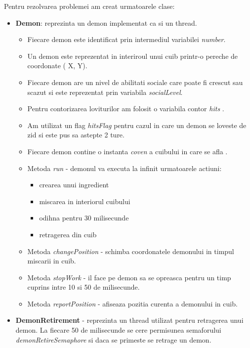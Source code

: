 \documentclass{article}
\begin{document}
    Pentru rezolvarea problemei am creat urmatoarele clase:
        \begin{itemize}
        \item \textbf{Demon}: reprezinta un demon implementat ca si un thread.
        \vspace{0.5cm}
         \begin{itemize}
        \item Fiecare demon este identificat prin intermediul variabilei \textit{number}. 
        \item Un demon este reprezentat in interiroul unui cuib printr-o pereche de coordonate ( X, Y). 
        \item Fiecare demon are un nivel de abilitati sociale care poate fi crescut sau scazut si este reprezentat prin variabila  \textit{socialLevel}.
        \item Pentru contorizarea loviturilor am folosit o variabila contor \textit{hits} .  
        \item Am utilizat un flag \textit{hitsFlag} pentru cazul in care un demon se loveste de zid si este pus sa astepte 2 ture.
        \item Fiecare demon contine o instanta \textit{coven} a cuibului in care se afla .
        \item Metoda \textit{run} - demonul va executa la infinit urmatoarele actiuni:
                \begin{itemize}
                    \item crearea unui ingredient
                    \item miscarea in interiorul cuibului
                    \item odihna pentru 30 milisecunde
                    \item retragerea din cuib
                \end{itemize}
            \item Metoda \textit{changePosition} - schimba coordonatele demonului in timpul miscarii in cuib.
            \item Metoda \textit{stopWork} - il face pe demon sa se opreasca pentru un timp cuprins intre 10 si 50 de milisecunde.
            \item Metoda \textit{reportPosition} - afiseaza pozitia curenta a demonului in cuib.
            \end{itemize}
        \item \textbf{DemonRetirement} - reprezinta un thread utilizat pentru retragerea unui demon. La fiecare 50 de milisecunde se cere permisunea semaforului \textit{demonRetireSemaphore} si daca se primeste se retrage un demon.
            

\end{itemize}
\end{document}
